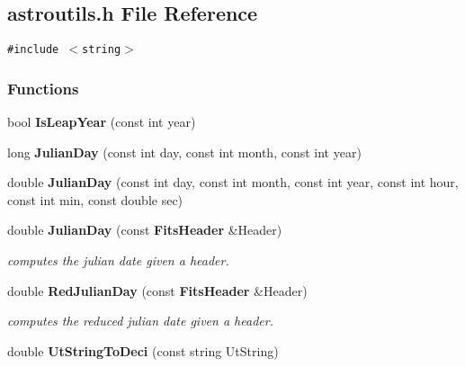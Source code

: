 \subsection{astroutils.h File Reference}
\label{astroutils_h}
{\tt \#include $<$string$>$}\par
\subsubsection*{Functions}
\begin{CompactItemize}
\item 
{}
bool {\bf Is\-Leap\-Year} (const int year)\label{astroutils_h_a0}

\item 
{}
long {\bf Julian\-Day} (const int day, const int month, const int year)\label{astroutils_h_a1}

\item 
{}
double {\bf Julian\-Day} (const int day, const int month, const int year, const int hour, const int min, const double sec)\label{astroutils_h_a2}

\item 
{}
double {\bf Julian\-Day} (const {\bf Fits\-Header} \&Header)\label{astroutils_h_a3}

\begin{CompactList}\small\item\em computes the julian date given a header.\item\end{CompactList}\item 
{}
double {\bf Red\-Julian\-Day} (const {\bf Fits\-Header} \&Header)\label{astroutils_h_a4}

\begin{CompactList}\small\item\em computes the reduced julian date given a header.\item\end{CompactList}\item 
{}
double {\bf Ut\-String\-To\-Deci} (const string Ut\-String)\label{astroutils_h_a5}


\end{CompactItemize}
